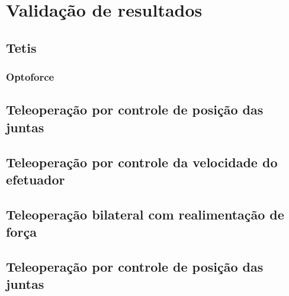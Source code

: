 \chapter{Validação de resultados}
\label{ch5}

\section{Tetis}
\subsection{Optoforce}

\section{Teleoperação por controle de posição das juntas}

\section{Teleoperação por controle da velocidade do efetuador}

\section{Teleoperação bilateral com realimentação de força}

\section{Teleoperação por controle de posição das juntas}